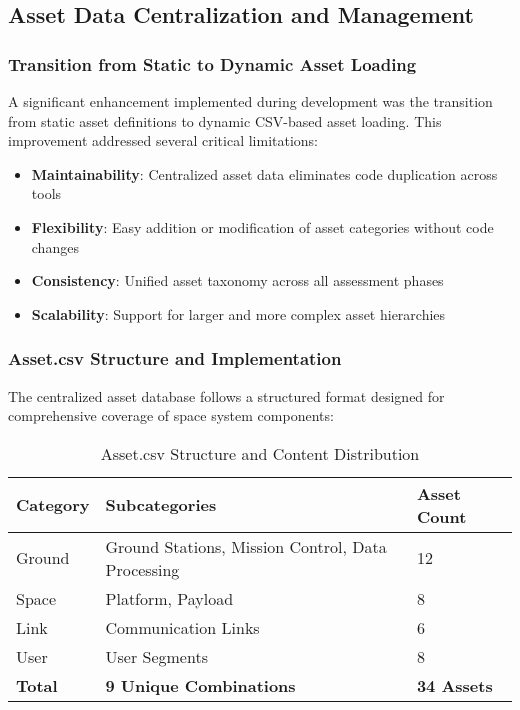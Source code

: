 \documentclass[binding=0.6cm]{sapthesis}
\begin{document}
\subsection{Asset Data Centralization and Management}

\subsubsection{Transition from Static to Dynamic Asset Loading}

A significant enhancement implemented during development was the transition from static asset definitions to dynamic CSV-based asset loading. This improvement addressed several critical limitations:

\begin{itemize}
    \item \textbf{Maintainability}: Centralized asset data eliminates code duplication across tools
    \item \textbf{Flexibility}: Easy addition or modification of asset categories without code changes
    \item \textbf{Consistency}: Unified asset taxonomy across all assessment phases
    \item \textbf{Scalability}: Support for larger and more complex asset hierarchies
\end{itemize}

\subsubsection{Asset.csv Structure and Implementation}

The centralized asset database follows a structured format designed for comprehensive coverage of space system components:

\begin{table}[H]
\centering
\caption{Asset.csv Structure and Content Distribution}
\begin{tabular}{|l|l|l|}
\hline
\textbf{Category} & \textbf{Subcategories} & \textbf{Asset Count} \\ \hline
Ground & Ground Stations, Mission Control, Data Processing & 12 \\ \hline
Space & Platform, Payload & 8 \\ \hline
Link & Communication Links & 6 \\ \hline
User & User Segments & 8 \\ \hline
\textbf{Total} & \textbf{9 Unique Combinations} & \textbf{34 Assets} \\ \hline
\end{tabular}
\end{table}
\end{document}

